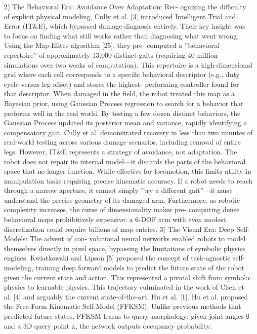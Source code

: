 \documentclass[10pt,twocolumn,letterpaper]{article}
\begin{document}
2) The Behavioral Era: Avoidance Over Adaptation: Rec- ognizing the difficulty of explicit physical modeling, Cully et al. [3] introduced Intelligent Trial and Error (IT\&E), which bypassed damage diagnosis entirely. Their key insight was to focus on finding what still works rather than diagnosing what went wrong. Using the Map-Elites algorithm [25], they pre- computed a ”behavioral repertoire” of approximately 13,000 distinct gaits (requiring 40 million simulations over two weeks of computation). This repertoire is a high-dimensional grid where each cell corresponds to a specific behavioral descriptor (e.g., duty cycle versus leg offset) and stores the highest- performing controller found for that descriptor. When damaged in the field, the robot treated this map as a Bayesian prior, using Gaussian Process regression to search for a behavior that performs well in the real world. By testing a few dozen distinct behaviors, the Gaussian Process updated its posterior mean and variance, rapidly identifying a compensatory gait. Cully et al. demonstrated recovery in less than two minutes of real-world testing across various damage scenarios, including removal of entire legs. However, IT\&E represents a strategy of avoidance, not adaptation. The robot does not repair its internal model—it discards the parts of the behavioral space that no longer function. While effective for locomotion, this limits utility in manipulation tasks requiring precise kinematic accuracy. If a robot needs to reach through a narrow aperture, it cannot simply ”try a different gait”—it must understand the precise geometry of its damaged arm. Furthermore, as robotic complexity increases, the curse of dimensionality makes pre- computing dense behavioral maps prohibitively expensive: a 6-DOF arm with even modest discretization could require billions of map entries. 3) The Visual Era: Deep Self-Models: The advent of con- volutional neural networks enabled robots to model themselves directly in pixel space, bypassing the limitations of symbolic physics engines. Kwiatkowski and Lipson [5] proposed the concept of task-agnostic self-modeling, training deep forward models to predict the future state of the robot given the current state and action. This represented a pivotal shift from symbolic physics to learnable physics. This trajectory culminated in the work of Chen et al. [4] and arguably the current state-of-the-art, Hu et al. [1]. Hu et al. proposed the Free-Form Kinematic Self-Model (FFKSM). Unlike previous methods that predicted future states, FFKSM learns to query morphology: given joint angles θ and a 3D query point x, the network outputs occupancy probability:
\end{document}
